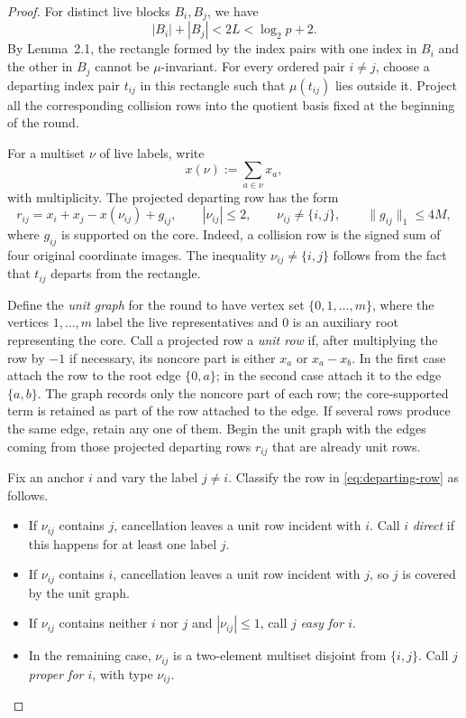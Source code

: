 \documentclass[10pt]{article}
\theoremstyle{definition}
\begin{document}
\begin{proof}
For distinct live blocks $B_i,B_j$, we have
\[
    |B_i|+|B_j|<2L<\log_2p+2.
\]
By Lemma~2.1, the rectangle formed by the index pairs with one index in
$B_i$ and the other in $B_j$ cannot be $\mu$-invariant.  For every ordered
pair $i\ne j$, choose a departing index pair $t_{ij}$ in this rectangle such
that $\mu(t_{ij})$ lies outside it.  Project all the corresponding collision
rows into the quotient basis fixed at the beginning of the round.

For a multiset $\nu$ of live labels, write
\[
    x(\nu):=\sum_{a\in\nu}x_a,
\]
with multiplicity.  The projected departing row has the form
\begin{equation}
    r_{ij}=x_i+x_j-x(\nu_{ij})+g_{ij},
    \qquad
    |\nu_{ij}|\le2,
    \qquad
    \nu_{ij}\ne\{i,j\},
    \qquad
    \|g_{ij}\|_1\le4M,
    \tag{4.1}
    \label{eq:departing-row}
\end{equation}
where $g_{ij}$ is supported on the core.  Indeed, a collision row is the
signed sum of four original coordinate images.  The inequality
$\nu_{ij}\ne\{i,j\}$ follows from the fact that $t_{ij}$ departs from the
rectangle.

Define the \emph{unit graph} for the round to have vertex set
$\{0,1,\ldots,m\}$, where the vertices $1,\ldots,m$ label the live
representatives and $0$ is an auxiliary root representing the core.  Call a
projected row a \emph{unit row} if, after multiplying the row by $-1$ if
necessary, its noncore part is either $x_a$ or $x_a-x_b$.  In the first case
attach the row to the root edge $\{0,a\}$; in the second case attach it to
the edge $\{a,b\}$.  The graph records only the noncore part of each row;
the core-supported term is retained as part of the row attached to the
edge.  If several rows produce the same edge, retain any one of them.  Begin
the unit graph with the edges coming from those projected departing rows
$r_{ij}$ that are already unit rows.

Fix an anchor $i$ and vary the label $j\ne i$.  Classify the row in
\eqref{eq:departing-row} as follows.
\begin{itemize}
    \item If $\nu_{ij}$ contains $j$, cancellation leaves a unit row incident
          with $i$.  Call $i$ \emph{direct} if this happens for at least one
          label $j$.
    \item If $\nu_{ij}$ contains $i$, cancellation leaves a unit row incident
          with $j$, so $j$ is covered by the unit graph.
    \item If $\nu_{ij}$ contains neither $i$ nor $j$ and
          $|\nu_{ij}|\le1$, call $j$ \emph{easy for $i$}.
    \item In the remaining case, $\nu_{ij}$ is a two-element multiset
          disjoint from $\{i,j\}$.  Call $j$ \emph{proper for $i$}, with
          type $\nu_{ij}$.
\end{itemize}


\end{proof}
\end{document}
